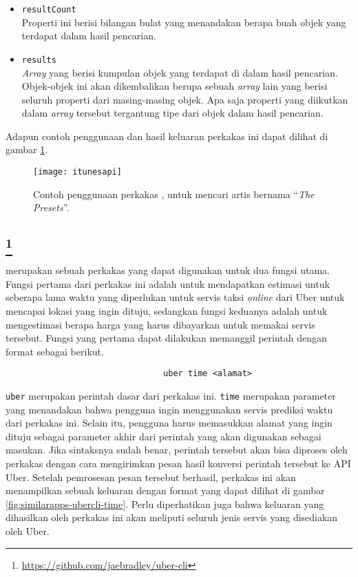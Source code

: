 \begin{itemize}
	\item \verb|resultCount|\\
	Properti ini berisi bilangan bulat yang menandakan berapa buah objek yang terdapat dalam hasil pencarian.
	\item \verb|results|\\
	\textit{Array} yang berisi kumpulan objek yang terdapat di dalam hasil pencarian. Objek-objek ini akan dikembalikan berupa sebuah \textit{array} lain yang berisi seluruh properti dari masing-masing objek. Apa saja properti yang diikutkan dalam \textit{array} tersebut tergantung tipe dari objek dalam hasil pencarian.
\end{itemize}
\vspace{\baselineskip}
Adapun contoh penggunaan dan hasil keluaran perkakas ini dapat dilihat di gambar \ref{fig:similarapps-itunesapi}.

\begin{figure}[ht]
    \centering
    \texttt{[image: itunesapi]}
    \caption[Contoh penggunaan perkakas \itunesapi]{Contoh penggunaan perkakas \itunesapi, untuk mencari artis bernama ``\textit{The Presets}''.}
    \label{fig:similarapps-itunesapi}
\end{figure}

\subsection{\ubercli\footnote{\href{https://github.com/jaebradley/uber-cli}{https://github.com/jaebradley/uber-cli}}}
\label{sec:similarapps-ubercli}

\ubercli merupakan sebuah perkakas \cl yang dapat digunakan untuk dua fungsi utama. Fungsi pertama dari perkakas ini adalah untuk mendapatkan estimasi untuk seberapa lama waktu yang diperlukan untuk servis taksi \textit{online} dari Uber untuk mencapai lokasi yang ingin dituju, sedangkan fungsi keduanya adalah untuk mengestimasi berapa harga yang harus dibayarkan untuk memakai servis tersebut. 
\newline\newline\noindent
Fungsi yang pertama dapat dilakukan memanggil perintah dengan format sebagai berikut.

\begin{verbatim}
                                uber time <alamat>
\end{verbatim}

\verb|uber| merupakan perintah dasar dari perkakas ini. \verb|time| merupakan parameter yang menandakan bahwa pengguna ingin menggunakan servis prediksi waktu dari perkakas ini. Selain itu, pengguna harus memasukkan alamat yang ingin dituju sebagai parameter akhir dari perintah yang akan digunakan sebagai masukan. Jika sintaksnya sudah benar, perintah tersebut akan bisa diproses oleh perkakas dengan cara mengirimkan pesan hasil konversi perintah tersebut ke API Uber. Setelah pemrosesan pesan tersebut berhasil, perkakas ini akan menampilkan sebuah keluaran dengan format yang dapat dilihat di gambar \ref{fig:similarapps-ubercli-time}. Perlu diperhatikan juga bahwa keluaran yang dihasilkan oleh perkakas ini akan meliputi seluruh jenis servis yang disediakan oleh Uber.

